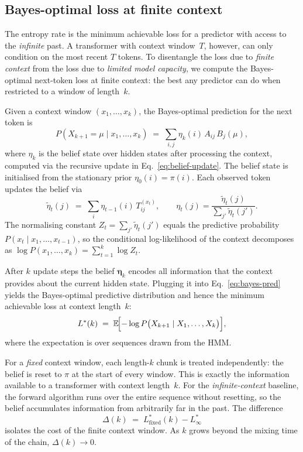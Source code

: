 \documentclass[11pt]{article}
\begin{document}
\subsection{Bayes-optimal loss at finite context}\label{sec:bayes-optimal}

The entropy rate is the minimum achievable loss for a predictor with access to the \emph{infinite} past.  A transformer with context window~$T$, however, can only condition on the most recent $T$ tokens.  To disentangle the loss due to \emph{finite context} from the loss due to \emph{limited model capacity}, we compute the Bayes-optimal next-token loss at finite context: the best any predictor can do when restricted to a window of length~$k$.

Given a context window $(x_1,\dots,x_k)$, the Bayes-optimal prediction for the next token is
\begin{equation}\label{eq:bayes-pred}
  P(X_{k+1}{=}\mu \mid x_1,\dots,x_k)
  \;=\; \sum_{i,j} \eta_k(i)\, A_{ij}\, B_j(\mu),
\end{equation}
where $\eta_k$ is the belief state over hidden states after processing the context, computed via the recursive update in Eq.~\eqref{eq:belief-update}.  The belief state is initialised from the stationary prior $\eta_0(i) = \pi(i)$.  Each observed token updates the belief via
\begin{equation}\label{eq:forward-update}
  \tilde{\eta}_t(j)
  \;=\; \sum_i \eta_{t-1}(i)\, T^{(x_t)}_{ij},
  \qquad
  \eta_t(j) = \frac{\tilde{\eta}_t(j)}
                    {\displaystyle\sum_{j'}\tilde{\eta}_t(j')}.
\end{equation}
The normalising constant $Z_t = \sum_{j'}\tilde{\eta}_t(j')$ equals the predictive probability $P(x_t \mid x_1,\dots,x_{t-1})$, so the conditional log-likelihood of the context decomposes as $\log P(x_1,\dots,x_k) = \sum_{t=1}^{k} \log Z_t$.

After $k$ update steps the belief $\boldsymbol{\eta}_k$ encodes all information that the context provides about the current hidden state.  Plugging it into Eq.~\eqref{eq:bayes-pred} yields the Bayes-optimal predictive distribution and hence the minimum achievable loss at context length~$k$:
\begin{equation}\label{eq:Lstar}
  L^{*}(k)
  \;=\; \mathbb{E}\!\Bigl[
    -\log P\bigl(X_{k+1} \mid X_1,\dots,X_k\bigr)
  \Bigr],
\end{equation}
where the expectation is over sequences drawn from the HMM\@.

For a \emph{fixed} context window, each length-$k$ chunk is treated independently: the belief is reset to $\pi$ at the start of every window.  This is exactly the information available to a transformer with context length~$k$.  For the \emph{infinite-context} baseline, the forward algorithm runs over the entire sequence without resetting, so the belief accumulates information from arbitrarily far in the past.  The difference
\begin{equation}
  \Delta(k) \;=\; L^{*}_{\text{fixed}}(k) - L^{*}_{\infty}
\end{equation}
isolates the cost of the finite context window.  As $k$ grows beyond the mixing time of the chain, $\Delta(k) \to 0$.
\end{document}
